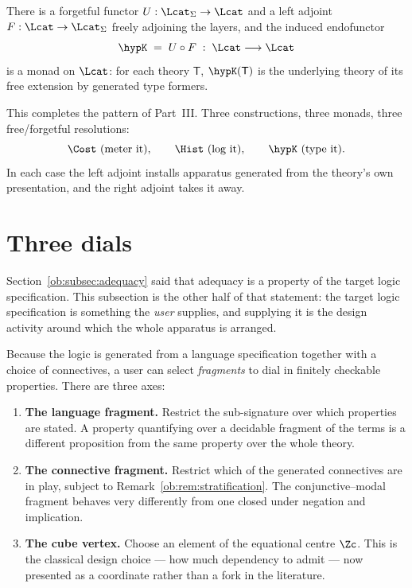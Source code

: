 \begin{proposition}
There is a forgetful functor $U : \Lcat_\Sigma \to \Lcat$ and a left adjoint
$F : \Lcat \to \Lcat_\Sigma$ freely adjoining the layers, and the induced endofunctor
\[
  \hypK \;=\; U \circ F \;:\; \Lcat \longrightarrow \Lcat
\]
is a monad on $\Lcat$: for each theory $\mathsf{T}$, $\hypK(\mathsf{T})$ is the underlying
theory of its free extension by generated type formers.
\end{proposition}

This completes the pattern of Part~III. Three constructions, three monads, three
free/forgetful resolutions:
\[
  \Cost \ \text{(meter it)}, \qquad
  \Hist \ \text{(log it)}, \qquad
  \hypK  \ \text{(type it)} .
\]
In each case the left adjoint installs apparatus generated from the theory's own
presentation, and the right adjoint takes it away.

\section{Three dials}
\label{ob:subsec:dials}

Section~\ref{ob:subsec:adequacy} said that adequacy is a property of the target logic
specification. This subsection is the other half of that statement: the target logic
specification is something the \emph{user} supplies, and supplying it is the design
activity around which the whole apparatus is arranged.

Because the logic is generated from a language specification together with a choice of
connectives, a user can select \emph{fragments} to dial in finitely checkable properties.
There are three axes:

\begin{enumerate}[label=(\arabic*),leftmargin=2.5em]
  \item \textbf{The language fragment.} Restrict the sub-signature over which properties
    are stated. A property quantifying over a decidable fragment of the terms is a
    different proposition from the same property over the whole theory.
  \item \textbf{The connective fragment.} Restrict which of the generated connectives are
    in play, subject to Remark~\ref{ob:rem:stratification}. The conjunctive--modal fragment
    behaves very differently from one closed under negation and implication.
  \item \textbf{The cube vertex.} Choose an element of the equational centre $\Zc$. This
    is the classical design choice --- how much dependency to admit --- now presented as a
    coordinate rather than a fork in the literature.
\end{enumerate}

